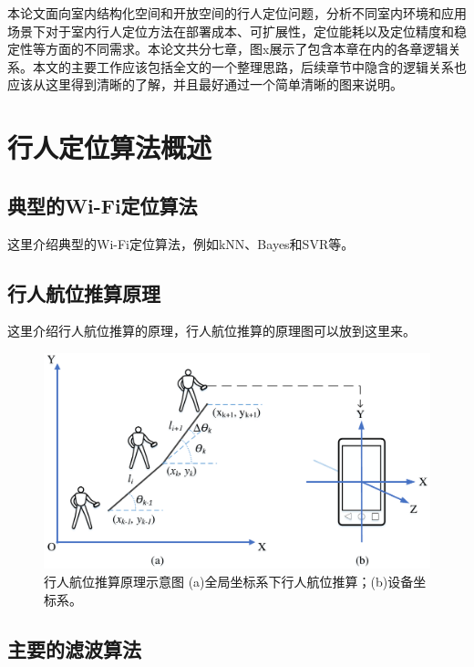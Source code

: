 本论文面向室内结构化空间和开放空间的行人定位问题，分析不同室内环境和应用场景下对于室内行人定位方法在部署成本、可扩展性，定位能耗以及定位精度和稳定性等方面的不同需求。本论文共分七章，图x展示了包含本章在内的各章逻辑关系。本文的主要工作应该包括全文的一个整理思路，后续章节中隐含的逻辑关系也应该从这里得到清晰的了解，并且最好通过一个简单清晰的图来说明。




\chapter{行人定位算法概述}

\section{典型的Wi-Fi定位算法}

这里介绍典型的Wi-Fi定位算法，例如kNN、Bayes和SVR等。

\section{行人航位推算原理}

这里介绍行人航位推算的原理，行人航位推算的原理图可以放到这里来。

\begin{figure}[htb]
	\centering
	\includegraphics[width=4.75in]{./figures/2/IndoorPos-PDRSchema}
	\caption{行人航位推算原理示意图 (a)全局坐标系下行人航位推算；(b)设备坐标系。}
	\label{fig-pdr}
\end{figure}

\section{主要的滤波算法}

